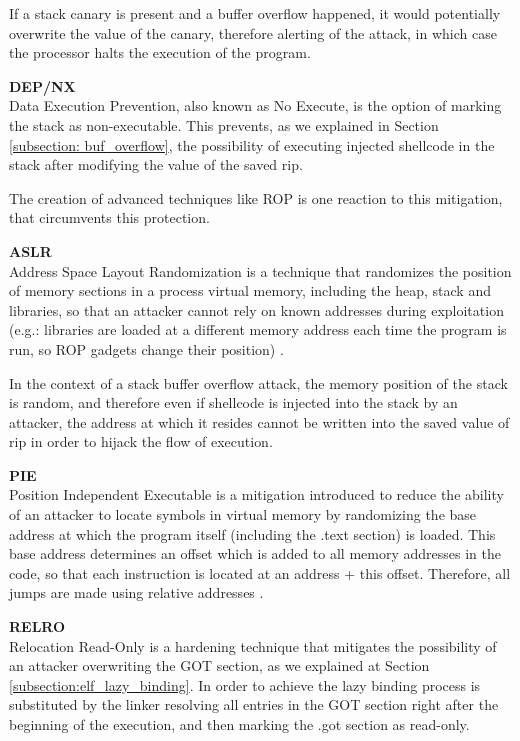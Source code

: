 If a stack canary is present and a buffer overflow happened, it would potentially overwrite the value of the canary, therefore alerting of the attack, in which case the processor halts the execution of the program.

\textbf{DEP/NX}\\
Data Execution Prevention, also known as No Execute, is the option of marking the stack as non-executable. This prevents, as we explained in Section \ref{subsection: buf_overflow}, the possibility of executing injected shellcode in the stack after modifying the value of the saved rip.

The creation of advanced techniques like ROP is one reaction to this mitigation, that circumvents this protection.

\textbf{ASLR}\\
Address Space Layout Randomization is a technique that randomizes the position of memory sections in a process virtual memory, including the heap, stack and libraries, so that an attacker cannot rely on known addresses during exploitation (e.g.: libraries are loaded at a different memory address each time the program is run, so ROP gadgets change their position) \cite{aslr_pie_intro}.

In the context of a stack buffer overflow attack, the memory position of the stack is random, and therefore even if shellcode is injected into the stack by an attacker, the address at which it resides cannot be written into the saved value of rip in order to hijack the flow of execution.

\textbf{PIE}\\
Position Independent Executable is a mitigation introduced to reduce the ability of an attacker to locate symbols in virtual memory by randomizing the base address at which the program itself (including the .text section) is loaded. This base address determines an offset which is added to all memory addresses in the code, so that each instruction is located at an address + this offset. Therefore, all jumps are made using relative addresses \cite{aslr_pie_intro}.

\textbf{RELRO}\\
Relocation Read-Only is a hardening technique that mitigates the possibility of an attacker overwriting the GOT section, as we explained at Section \ref{subsection:elf_lazy_binding}. In order to achieve the lazy binding process is substituted by the linker resolving all entries in the GOT section right after the beginning of the execution, and then marking the .got section as read-only. 

